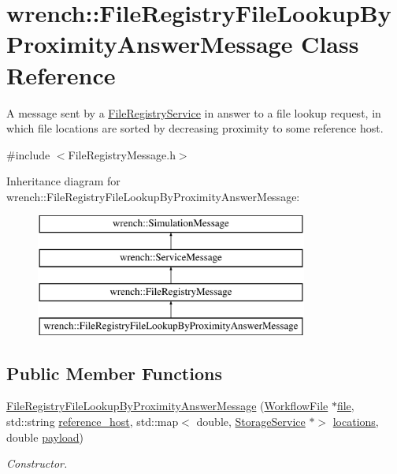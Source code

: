 \hypertarget{classwrench_1_1_file_registry_file_lookup_by_proximity_answer_message}{}\section{wrench\+:\+:File\+Registry\+File\+Lookup\+By\+Proximity\+Answer\+Message Class Reference}
\label{classwrench_1_1_file_registry_file_lookup_by_proximity_answer_message}


A message sent by a \hyperlink{classwrench_1_1_file_registry_service}{File\+Registry\+Service} in answer to a file lookup request, in which file locations are sorted by decreasing proximity to some reference host.  




{\ttfamily \#include $<$File\+Registry\+Message.\+h$>$}

Inheritance diagram for wrench\+:\+:File\+Registry\+File\+Lookup\+By\+Proximity\+Answer\+Message\+:\begin{figure}[H]
\begin{center}
\leavevmode
\includegraphics[height=4.000000cm]{classwrench_1_1_file_registry_file_lookup_by_proximity_answer_message}
\end{center}
\end{figure}
\subsection*{Public Member Functions}
\begin{DoxyCompactItemize}
\item 
\hyperlink{classwrench_1_1_file_registry_file_lookup_by_proximity_answer_message_adf913dc2c9cbc469a5cd57f149259a77}{File\+Registry\+File\+Lookup\+By\+Proximity\+Answer\+Message} (\hyperlink{classwrench_1_1_workflow_file}{Workflow\+File} $\ast$\hyperlink{classwrench_1_1_file_registry_file_lookup_by_proximity_answer_message_af2715215a2126aef33bc74809d61fc54}{file}, std\+::string \hyperlink{classwrench_1_1_file_registry_file_lookup_by_proximity_answer_message_a91a458a389b51fc43095d72305223b1a}{reference\+\_\+host}, std\+::map$<$ double, \hyperlink{classwrench_1_1_storage_service}{Storage\+Service} $\ast$$>$ \hyperlink{classwrench_1_1_file_registry_file_lookup_by_proximity_answer_message_afd27d56abf5c464405ec7cbb26af69a2}{locations}, double \hyperlink{classwrench_1_1_simulation_message_a914f2732713f7c02898e66f05a7cb8a1}{payload})
\begin{DoxyCompactList}\small\item\em Constructor. \end{DoxyCompactList}\end{DoxyCompactItemize}
